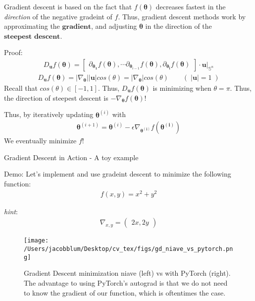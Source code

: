 \documentclass{beamer}
\begin{document}
\begin{frame}
\small{Gradient descent is based on the fact that $f(\boldsymbol{\theta})$ decreases fastest in the \textit{direction} of the negative gradeint of $f$.}
\small{Thus, gradient descent methods work by approximating the $\textbf{gradient}$, and adjusting $\boldsymbol{\theta}$ in the direction of the $\textbf{steepest descent}$.}

\begin{block}{Proof:}
\begin{align*}
    D_{\mathbf{u}} f(\boldsymbol{\theta}) = \begin{bmatrix}
        \partial_{\boldsymbol{\theta_{1}}} f(\boldsymbol{\theta}) , \cdots \partial_{\boldsymbol{\theta}_{i-1}} f(\boldsymbol{\theta}), \partial_{\boldsymbol{\theta_{i}}} f(\boldsymbol{\theta})
    \end{bmatrix} \cdot \mathbf{u} \vert_{\mathbb{S}^{n}}
\end{align*}
\begin{align*}
    D_{\mathbf{u}} f(\boldsymbol{\theta}) = | \nabla_{\boldsymbol{\theta}} | |\mathbf{u}| cos(\theta) = | \nabla_{\boldsymbol{\theta}} | cos(\theta) \qquad ( \; |\mathbf{u}| = 1 \; )
\end{align*}
Recall that $cos(\theta) \in [-1, 1]$. Thus,  $D_{\mathbf{u}} f(\boldsymbol{\theta})$ is minimizing when $\theta = \pi$. Thus, the direction of steepest
descent is $-\nabla_{\boldsymbol{\theta}}f(\boldsymbol{\theta})$! 
\end{block}
Thus, by iteratively updating $\boldsymbol{\theta}^{(i)}$ with
\begin{align*}
    \boldsymbol{\theta}^{(i+1)} = \boldsymbol{\theta}^{(i)} - \epsilon \nabla_{\boldsymbol{\theta^{(i)}}}f(\boldsymbol{\theta^{(i)}})
\end{align*}
We eventually minimize $f$!
\end{frame}

\begin{frame}[plain]{Gradient Descent in Action - A toy example}

\begin{block}{Demo:}
    \small{Let's implement and use gradeint descent to minimize the following function:}
    \begin{align*}
        f(x,y) = x^2 + y^2
    \end{align*}

    \textit{hint}:
    \begin{align*}
        \nabla_{x,y} = \begin{pmatrix}
            2x, 2y
        \end{pmatrix}
    \end{align*}
\end{block}

\begin{figure}
    \centering
        \texttt{[image: /Users/jacobblum/Desktop/cv\_tex/figs/gd\_niave\_vs\_pytorch.png]}
        \caption{Gradient Descent minimization niave (left) vs with PyTorch (right). The advantage to using PyTorch's autograd is that we do not need 
        to know the gradient of our function, which is oftentimes the case.}
    \end{figure}
\end{frame}
\end{document}

